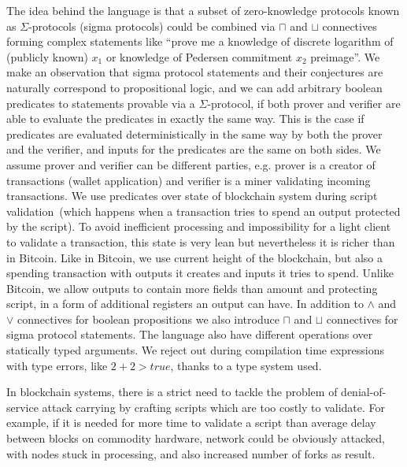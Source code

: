 \documentclass[11pt]{article}
\begin{document}
The idea behind the language is that a subset of zero-knowledge protocols known as $\Sigma$-protocols (sigma protocols) could be combined via $\sqcap$ and $\sqcup$ connectives forming complex statements like ``prove me a knowledge of discrete logarithm of (publicly known) $x_1$ or knowledge of Pedersen commitment $x_2$ preimage''. We make an observation that sigma protocol statements and their conjectures are naturally correspond to propositional logic, and we can add arbitrary boolean predicates to statements provable via a $\Sigma$-protocol, if both prover and verifier are able to evaluate the predicates in exactly the same way. This is the case if predicates are evaluated deterministically in the same way by both the prover and the verifier, and inputs for the predicates are the same on both sides.
We assume prover and verifier can be different parties, e.g. prover is a creator of transactions (wallet application) and verifier is a miner validating incoming transactions.
We use predicates over state of blockchain system during script validation~(which happens when a transaction tries to spend an output protected by the script). To avoid inefficient processing and impossibility for a light client to validate a transaction, this state is very lean but nevertheless it is richer than in Bitcoin. Like in Bitcoin, we use current height of the blockchain, but also a spending transaction with outputs it creates and inputs it tries to spend. Unlike Bitcoin, we allow outputs to contain more fields than amount and protecting script, in a form of additional registers an output can have. In addition to $\land$ and $\lor$ connectives for boolean propositions we also introduce $\sqcap$ and $\sqcup$ connectives for sigma protocol statements. The language also have different operations over statically typed arguments. We reject out during compilation time expressions with type errors, like $2 + 2 > true$, thanks to a type system used.

In blockchain systems, there is a strict need to tackle the problem of denial-of-service attack carrying by crafting scripts which are too costly to validate. For example, if it is needed for more time to validate a script than average delay between blocks on commodity hardware, network could be obviously attacked, with nodes stuck in processing, and also increased number of forks as result. 
\end{document}
